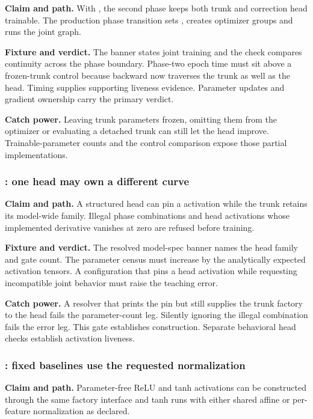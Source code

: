 \textbf{Claim and path.}  With , the second phase
keeps both trunk and correction head trainable.  The production phase
transition sets , creates optimizer groups and runs the
joint graph.

\textbf{Fixture and verdict.}  The banner states joint training and the check
compares continuity across the phase boundary.  Phase-two epoch time must sit
above a frozen-trunk control because backward now traverses the trunk as well
as the head.  Timing supplies supporting liveness evidence.  Parameter updates
and gradient ownership carry the primary verdict.

\textbf{Catch power.}  Leaving trunk parameters frozen, omitting them from the
optimizer or evaluating a detached trunk can still let the head improve.
Trainable-parameter counts and the control comparison expose those partial
implementations.

\subsubsection{: one head may own a different curve}

\textbf{Claim and path.}  A structured head can pin a 
activation while the trunk retains its model-wide family.  Illegal phase
combinations and head activations whose implemented derivative vanishes at
zero are refused before training.

\textbf{Fixture and verdict.}  The resolved model-spec banner names the head
family and gate count.  The parameter census must increase by the analytically
expected activation tensors.  A configuration that pins a head activation
while requesting incompatible joint behavior must raise the teaching error.

\textbf{Catch power.}  A resolver that prints the pin but still supplies the
trunk factory to the head fails the parameter-count leg.  Silently ignoring
the illegal combination fails the error leg.  This gate establishes
construction.  Separate behavioral head checks establish activation liveness.

\subsubsection{: fixed baselines use the requested normalization}

\textbf{Claim and path.}  Parameter-free ReLU and tanh activations can be
constructed through the same factory interface and tanh runs with either
shared affine or per-feature normalization as declared.

